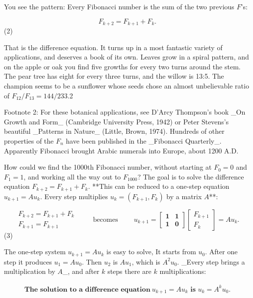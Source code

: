 You see the pattern: Every Fibonacci number is the sum of the two previous \(F\)'s:

\[F_{k+2}=F_{k+1}+F_{k}.\] (2)

That is the difference equation. It turns up in a most fantastic variety of applications, and deserves a book of its own. Leaves grow in a spiral pattern, and on the apple or oak you find five growths for every two turns around the stem. The pear tree has eight for every three turns, and the willow is 13:5. The champion seems to be a sunflower whose seeds chose an almost unbelievable ratio of \(F_{12}/F_{13}=144/233\).2

Footnote 2: For these botanical applications, see D’Arcy Thompson’s book _On Growth and Form_ (Cambridge University Press, 1942) or Peter Stevens’s beautiful _Patterns in Nature_ (Little, Brown, 1974). Hundreds of other properties of the \(F_{n}\) have been published in the _Fibonacci Quarterly_. Apparently Fibonacci brought Arabic numerals into Europe, about 1200 A.D.

How could we find the 1000th Fibonacci number, without starting at \(F_{0}=0\) and \(F_{1}=1\), and working all the way out to \(F_{1000}\)? The goal is to solve the difference equation \(F_{k+2}=F_{k+1}+F_{k}\). **This can be reduced to a one-step equation \(u_{k+1}=Au_{k}\). Every step multiplies \(u_{k}=(F_{k+1},F_{k})\) by a matrix \(A\)**:

\[\begin{array}{l}F_{k+2}=F_{k+1}+F_{k}\\ F_{k+1}=F_{k+1}\end{array}\qquad\text{ becomes }\qquad u_{k+1}=\begin{bmatrix} \mathbf{1}&\mathbf{1}\\ \mathbf{1}&\mathbf{0}\end{bmatrix}\begin{bmatrix}F_{k+1}\\ F_{k}\end{bmatrix}=Au_{k}.\] (3)

The one-step system \(u_{k+1}=Au_{k}\) is easy to solve, It starts from \(u_{0}\). After one step it produces \(u_{1}=Au_{0}\). Then \(u_{2}\) is \(Au_{1}\), which is \(A^{2}u_{0}\). _Every step brings a multiplication by \(A\)_, and after \(k\) steps there are \(k\) multiplications:

\[\boxed{\begin{array}{l}\textbf{The solution to a difference equation}\ u_{k+1}=Au_{k}\textbf{ is }u_{k}=A^{k}u_{0}.\end{array}}\]

